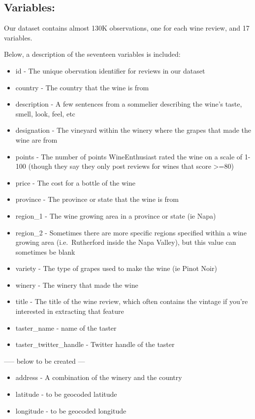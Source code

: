 \documentclass[12pt,twoside]{amherstthesis}
\providecommand{\tightlist}{%
  \setlength{\itemsep}{0pt}\setlength{\parskip}{0pt}}
\begin{document}
\subsection{Variables:}\label{variables}

Our dataset contains almost 130K observations, one for each wine review,
and 17 variables.

Below, a description of the seventeen variables is included:
\begin{itemize}
\tightlist
\item
  id - The unique obervation identifier for reviews in our dataset
\item
  country - The country that the wine is from
\item
  description - A few sentences from a sommelier describing the wine's
  taste, smell, look, feel, etc
\item
  designation - The vineyard within the winery where the grapes that
  made the wine are from
\item
  points - The number of points WineEnthusiast rated the wine on a scale
  of 1-100 (though they say they only post reviews for wines that score
  \textgreater{}=80)
\item
  price - The cost for a bottle of the wine
\item
  province - The province or state that the wine is from
\item
  region\_1 - The wine growing area in a province or state (ie Napa)
\item
  region\_2 - Sometimes there are more specific regions specified within
  a wine growing area (i.e.~Rutherford inside the Napa Valley), but this
  value can sometimes be blank
\item
  variety - The type of grapes used to make the wine (ie Pinot Noir)
\item
  winery - The winery that made the wine
\item
  title - The title of the wine review, which often contains the vintage
  if you're interested in extracting that feature
\item
  taster\_name - name of the taster
\item
  taster\_twitter\_handle - Twitter handle of the taster
\end{itemize}
----- below to be created ---
\begin{itemize}
\tightlist
\item
  address - A combination of the winery and the country
\item
  latitude - to be geocoded latitude
\item
  longitude - to be geocoded longitude
\end{itemize}
\end{document}
